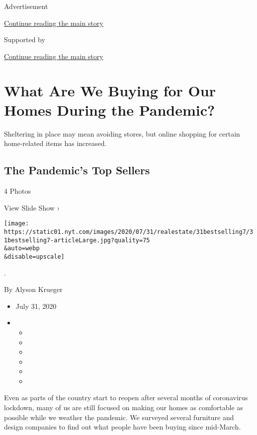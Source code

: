 Advertisement

\protect\hyperlink{after-top}{Continue reading the main story}

Supported by

\protect\hyperlink{after-sponsor}{Continue reading the main story}

\hypertarget{what-are-we-buying-for-our-homes-during-the-pandemic}{%
\section{What Are We Buying for Our Homes During the
Pandemic?}\label{what-are-we-buying-for-our-homes-during-the-pandemic}}

Sheltering in place may mean avoiding stores, but online shopping for
certain home-related items has increased.

\href{https://www.nytimes.com/slideshow/2020/07/31/realestate/the-pandemics-top-sellers.html}{}

\hypertarget{the-pandemics-top-sellers}{%
\subsection{The Pandemic's Top
Sellers}\label{the-pandemics-top-sellers}}

4 Photos

View Slide Show ›

\texttt{[image: https://static01.nyt.com/images/2020/07/31/realestate/31bestselling7/31bestselling7-articleLarge.jpg?quality=75\\\&auto=webp\\\&disable=upscale]}

.

By Alyson Krueger

\begin{itemize}
\item
  July 31, 2020
\item
  \begin{itemize}
  \item
  \item
  \item
  \item
  \item
  \item
  \end{itemize}
\end{itemize}

Even as parts of the country start to reopen after several months of
coronavirus lockdown, many of us are still focused on making our homes
as comfortable as possible while we weather the pandemic. We surveyed
several furniture and design companies to find out what people have been
buying since mid-March.

